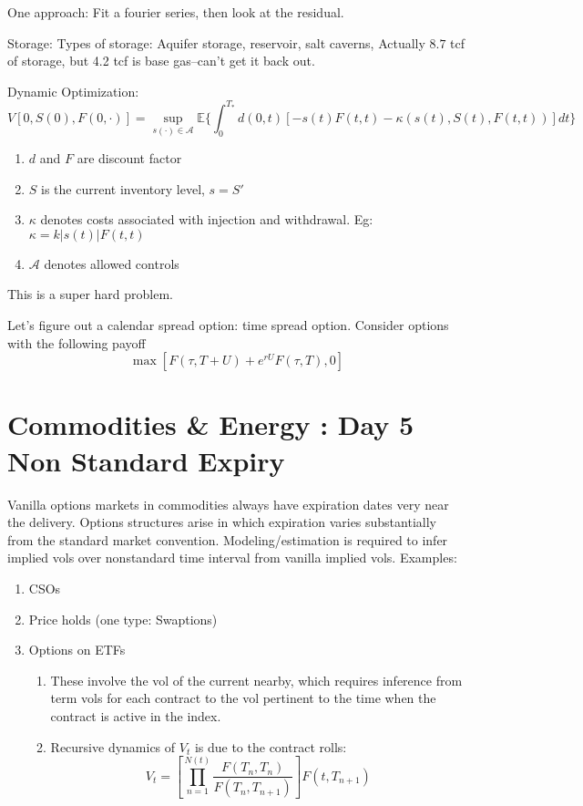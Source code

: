 One approach: Fit a fourier series, then look at the residual. 

Storage: Types of storage: Aquifer storage, reservoir, salt caverns, Actually $8.7$ tcf of storage, but 4.2 tcf is base gas--can't get it back out.

Dynamic Optimization:
\begin{equation}
	V[0,S(0),F(0,\cdot)] = \sup_{s(\cdot)\in \mathcal{A}} \mathbb{E} \{ \int_0^{T_*} d(0,t)\left[ -s(t)F(t,t) - \kappa(s(t), S(t), F(t,t))\right] dt \}
\end{equation}
\begin{enumerate}
	\item $d$ and $F$ are discount factor
	\item $S$ is the current inventory level, $s = S'$
	\item $\kappa$ denotes costs associated with injection and withdrawal. Eg: $\kappa = k|s(t)|F(t,t)$
	\item $\mathcal{A}$  denotes allowed controls
\end{enumerate}
This is a super hard problem.

Let's figure out a calendar spread option: time spread option. Consider options with the following payoff
\begin{equation}
	\max \left[ F(\tau, T+U) + e^{rU}F(\tau, T), 0\right]
\end{equation}

\chapter{Commodities \& Energy : Day 5 \\ Non Standard Expiry}
Vanilla options markets in commodities always have expiration dates very near the delivery.
Options structures arise in which expiration varies substantially from the standard market convention. 
Modeling/estimation is required to infer implied vols over nonstandard time interval from vanilla implied vols.
Examples:
\begin{enumerate}
	\item CSOs
	\item Price holds (one type: Swaptions)
	\item Options on ETFs
	\begin{enumerate}
		\item These involve the vol of the current nearby, which requires inference from term vols for each contract to the vol pertinent to the time when the contract is active in the index.
		\item Recursive dynamics of $V_t$ is due to the contract rolls:
		\begin{equation}
			V_t = \left[\prod_{n=1}^{N(t)} \frac{F(T_n, T_n)}{F(T_n, T_{n+1})}  \right] F(t,T_{n+1})
		\end{equation}
	\end{enumerate}
\end{enumerate}

